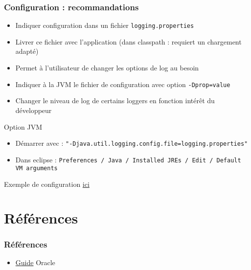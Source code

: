 \documentclass[english, french]{beamer}
\begin{document}
\begin{frame}[fragile]
	\frametitle{Configuration : recommandations}
	\begin{itemize}
		\item Indiquer configuration dans un fichier \texttt{logging.properties}
		\item Livrer ce fichier avec l’application {\tiny (dans classpath : requiert un chargement adapté)}
		\item Permet à l’utilisateur de changer les options de log au besoin
		\item Indiquer à la JVM le fichier de configuration avec option \texttt{-Dprop=value}
		\item Changer le niveau de log de certains loggers en fonction intérêt du développeur
	\end{itemize}
	\begin{block}{Option JVM}
		\begin{itemize}
			\item Démarrer avec : {\small\texttt{"-Djava.util.logging.config.file=logging.properties"}}
			\item Dans eclipse : \texttt{Preferences / Java / Installed JREs / Edit / Default VM arguments}\vspace{-1pt}
		\end{itemize}
	\end{block}
	Exemple de configuration \href{https://github.com/oliviercailloux/samples/blob/master/JavaSE-JUL-JPA-Hib-H2/logging.properties}{ici}
\end{frame}

\section{Références}
\begin{frame}
	\frametitle{Références}
	\begin{itemize}
		\item \href{https://docs.oracle.com/javase/8/docs/technotes/guides/logging/overview.html}{Guide} Oracle
	\end{itemize}
\end{frame}

\appendix
\end{document}
